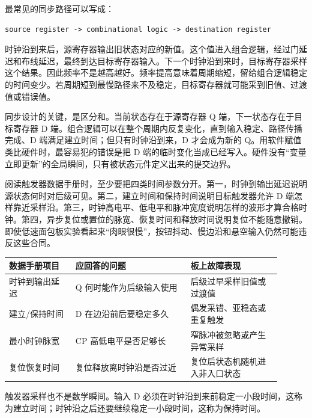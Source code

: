 最常见的同步路径可以写成：

\begin{lstlisting}
source register -> combinational logic -> destination register
\end{lstlisting}
\vspace{1.0em plus 0.35em}

时钟沿到来后，源寄存器输出旧状态对应的新值。这个值进入组合逻辑，经过门延迟和布线延迟，最终到达目标寄存器输入。下一个时钟沿到来时，目标寄存器采样这个结果。因此频率不是越高越好。频率提高意味着周期缩短，留给组合逻辑稳定的时间变少。若周期短到最慢路径来不及稳定，目标寄存器就可能采到旧值、过渡值或错误值。

同步设计的关键，是区分和。当前状态存在于源寄存器 Q 端，下一状态存在于目标寄存器 D 端。组合逻辑可以在整个周期内反复变化，直到输入稳定、路径传播完成、D 端满足建立时间；但只有时钟沿到来，D 才会成为新的 Q。用软件赋值类比硬件时，最容易犯的错误是把 D 端的临时变化当成已经写入。硬件没有“变量立即更新”的全局瞬间，只有被状态元件定义出来的提交边界。

阅读触发器数据手册时，至少要把四类时间参数分开。第一，时钟到输出延迟说明源状态何时对后级可见。第二，建立时间和保持时间说明目标触发器允许 D 端怎样靠近采样沿。第三，时钟高电平、低电平和脉冲宽度说明怎样的波形才算合格时钟。第四，异步复位或置位的脉宽、恢复时间和释放时间说明复位不能随意撤销。即使低速面包板实验看起来“肉眼很慢”，按钮抖动、慢边沿和悬空输入仍然可能违反这些合同。

\begin{longtable}{L{0.22\linewidth}L{0.38\linewidth}L{0.3\linewidth}}
\toprule
数据手册项目 & 应回答的问题 & 板上故障表现 \\
\midrule
时钟到输出延迟 & Q 何时能作为后级输入使用 & 后级过早采样旧值或过渡值 \\
建立/保持时间 & D 在边沿前后要稳定多久 & 偶发采错、亚稳态或重复触发 \\
最小时钟脉宽 & CP 高低电平是否足够长 & 窄脉冲被忽略或产生异常采样 \\
复位恢复时间 & 复位释放离时钟沿是否过近 & 复位后状态机随机进入非入口状态 \\
\bottomrule
\end{longtable}
\vspace{1.0em plus 0.35em}

触发器采样也不是数学瞬间。输入 D 必须在时钟沿到来前稳定一小段时间，这称为建立时间；时钟沿之后还要继续稳定一小段时间，这称为保持时间。

